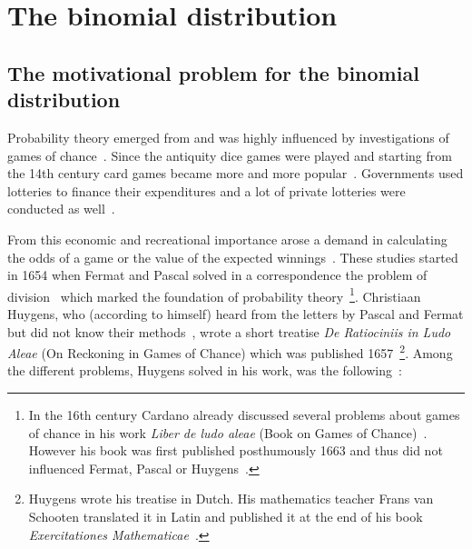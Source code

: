 \chapter{The binomial distribution}

\section{The motivational problem for the binomial distribution}

Probability theory emerged from and was highly influenced by investigations of games of chance~\cite[p. 4]{hald1}. Since the antiquity dice games were played and starting from the 14th century card games became more and more popular~\cite[pp. 33-34]{hald1}. Governments used lotteries to finance their expenditures and a lot of private lotteries were conducted as well~\cite[p. 34]{hald1}.


From this economic and recreational importance arose a demand in calculating the odds of a game or the value of the expected winnings~\cite[p. 34]{hald1}. These studies started in 1654 when Fermat and Pascal solved in a correspondence the problem of division~\cite[pp. 42-64]{hald1} which marked the foundation of probability theory~\cite[p. 4]{hald1}\footnote{In the 16th century Cardano already discussed several problems about games of chance in his work \emph{Liber de ludo aleae} (Book on Games of Chance)~\cite[pp. 33-41]{hald1}. However his book was first published posthumously 1663 and thus did not influenced Fermat, Pascal or Huygens~\cite[p. vii]{bernoulli}.}. Christiaan Huygens, who (according to himself) heard from the letters by Pascal and Fermat but did not know their methods~\cite[p. 67]{hald1}, wrote a short treatise \emph{De Ratiociniis in Ludo Aleae} (On Reckoning in Games of Chance) which was published 1657~\cite[p. vii]{bernoulli}\footnote{Huygens wrote his treatise in Dutch. His mathematics teacher Frans van Schooten translated it in Latin and published it at the end of his book \emph{Exercitationes Mathematicae}~\cite[pp. 65-68]{hald1}.}. Among the different problems, Huygens solved in his work, was the following~\cite[p. 163]{bernoulli}:

